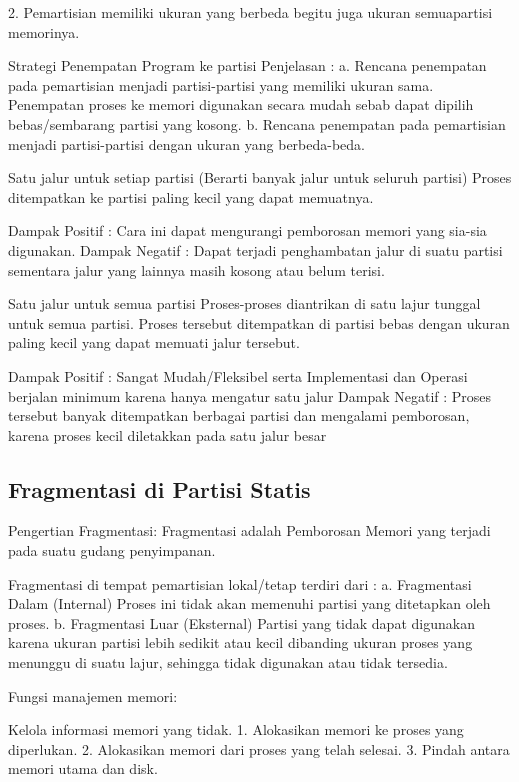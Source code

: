 2. Pemartisian memiliki ukuran yang berbeda begitu juga ukuran semuapartisi memorinya.

Strategi Penempatan Program ke partisi
Penjelasan :
a. Rencana penempatan pada pemartisian menjadi partisi-partisi yang memiliki ukuran sama. Penempatan proses ke memori digunakan secara mudah sebab dapat dipilih bebas/sembarang partisi yang kosong.
b. Rencana penempatan pada pemartisian menjadi partisi-partisi dengan ukuran yang berbeda-beda.

Satu jalur untuk setiap partisi (Berarti banyak jalur untuk seluruh partisi) Proses ditempatkan ke partisi paling kecil yang dapat memuatnya.

Dampak Positif : Cara ini dapat mengurangi pemborosan memori yang sia-sia digunakan.
Dampak Negatif : Dapat terjadi penghambatan jalur di suatu partisi sementara jalur yang lainnya masih kosong atau belum terisi.

Satu jalur untuk semua partisi Proses-proses diantrikan di satu lajur tunggal untuk semua partisi. Proses tersebut ditempatkan di partisi bebas dengan ukuran paling kecil yang dapat memuati jalur tersebut.

Dampak Positif : Sangat Mudah/Fleksibel serta Implementasi dan Operasi berjalan minimum karena hanya mengatur satu jalur
Dampak Negatif : Proses tersebut banyak ditempatkan berbagai partisi dan mengalami pemborosan, karena proses kecil diletakkan pada satu jalur besar

\subsection {Fragmentasi di Partisi Statis}

Pengertian Fragmentasi:
Fragmentasi adalah Pemborosan Memori yang terjadi pada suatu gudang penyimpanan.

Fragmentasi di tempat pemartisian lokal/tetap terdiri dari :
a. Fragmentasi Dalam (Internal)
Proses ini tidak akan memenuhi partisi yang ditetapkan oleh proses.
b. Fragmentasi Luar (Eksternal)
Partisi yang tidak dapat digunakan karena ukuran partisi lebih sedikit atau kecil dibanding ukuran proses yang menunggu di suatu lajur, sehingga tidak digunakan atau tidak tersedia.

Fungsi manajemen memori:

Kelola informasi memori yang tidak.
1. Alokasikan memori ke proses yang diperlukan.
2. Alokasikan memori dari proses yang telah selesai.
3. Pindah antara memori utama dan disk.

